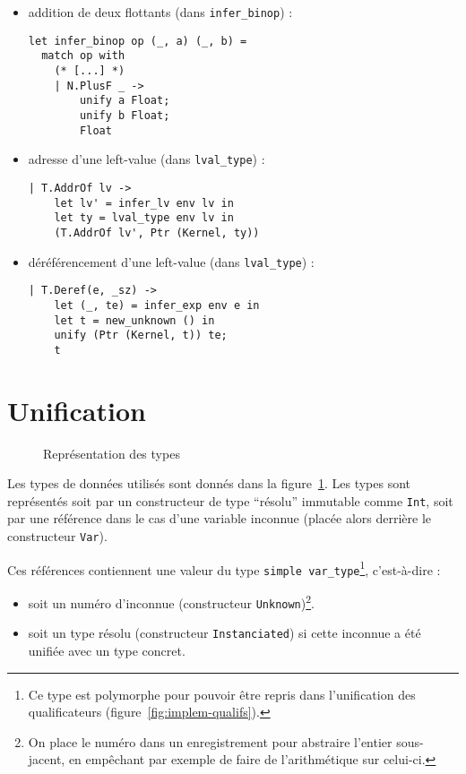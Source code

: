 \begin{itemize}
  \item addition de deux flottants (dans \texttt{infer\_binop}) :

\begin{verbatim}
let infer_binop op (_, a) (_, b) =
  match op with
    (* [...] *)
    | N.PlusF _ ->
        unify a Float;
        unify b Float;
        Float
\end{verbatim}

  \item adresse d'une left-value (dans \texttt{lval\_type}) :

\begin{verbatim}
| T.AddrOf lv ->
    let lv' = infer_lv env lv in
    let ty = lval_type env lv in
    (T.AddrOf lv', Ptr (Kernel, ty))
\end{verbatim}

  \item déréférencement d'une left-value (dans \texttt{lval\_type}) :

\begin{verbatim}
| T.Deref(e, _sz) ->
    let (_, te) = infer_exp env e in
    let t = new_unknown () in
    unify (Ptr (Kernel, t)) te;
    t
\end{verbatim}

\end{itemize}

\section{Unification}

\begin{figure}
\caption{Représentation des types}
\label{fig:implem-typ}
\end{figure}

Les types de données utilisés sont donnés dans la figure~\ref{fig:implem-typ}.
Les types \langname sont représentés soit par un constructeur de type ``résolu''
immutable comme \texttt{Int}, soit par une référence dans le cas d'une variable
inconnue (placée alors derrière le constructeur \texttt{Var}).

Ces références contiennent une valeur du type
\texttt{simple var\_type}\footnote{
  Ce type est polymorphe pour pouvoir être repris dans l'unification des
  qualificateurs (figure~\ref{fig:implem-qualifs}).
}, c'est-à-dire :

\begin{itemize}
\item soit un numéro d'inconnue (constructeur \texttt{Unknown})\footnote{On
  place le numéro dans un enregistrement pour abstraire l'entier sous-jacent, en
  empêchant par exemple de faire de l'arithmétique sur celui-ci.}.

\item soit un type résolu (constructeur \texttt{Instanciated}) si cette
  inconnue a été unifiée avec un type concret.
\end{itemize}

